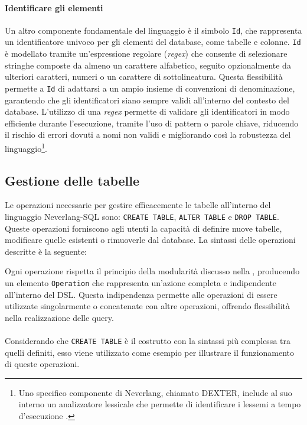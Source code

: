 \documentclass[12pt,a4paper,openright,twoside]{book}
\begin{document}
\paragraph{Identificare gli elementi}
Un altro componente fondamentale del linguaggio è il simbolo \texttt{Id}, che rappresenta un identificatore univoco per gli 
elementi del database, come tabelle e colonne. \texttt{Id} è modellato tramite un’espressione regolare (\textit{regex}) che consente 
di selezionare stringhe composte da almeno un carattere alfabetico, seguito opzionalmente da ulteriori caratteri, numeri o un 
carattere di sottolineatura. Questa flessibilità permette a \texttt{Id} di adattarsi a un ampio insieme di convenzioni di 
denominazione, garantendo che gli identificatori siano sempre validi all’interno del contesto del database. L’utilizzo di una 
\textit{regex} permette di validare gli identificatori in modo efficiente durante l’esecuzione, tramite l’uso di pattern o parole 
chiave, riducendo il rischio di errori dovuti a nomi non validi e migliorando così la robustezza del linguaggio\footnote{Uno 
specifico componente di Neverlang, chiamato DEXTER, include al suo interno un analizzatore lessicale che permette di identificare 
i lessemi a tempo d’esecuzione \cite{Dexter2012, Vacchi2015}.}.


\subsection{Gestione delle tabelle}
Le operazioni necessarie per gestire efficacemente le tabelle all’interno del linguaggio Neverlang-SQL sono: \texttt{CREATE TABLE}, \texttt{ALTER 
TABLE} e \texttt{DROP TABLE}. Queste operazioni forniscono agli utenti la capacità di definire nuove tabelle, modificare quelle esistenti o 
rimuoverle dal database. La sintassi delle operazioni descritte è la seguente:


Ogni operazione rispetta il principio della modularità discusso nella , producendo un elemento 
\texttt{Operation} che rappresenta un’azione completa e indipendente all’interno del DSL. Questa indipendenza permette alle 
operazioni di essere utilizzate singolarmente o concatenate con altre operazioni, offrendo flessibilità nella realizzazione delle 
query.\\\\
Considerando che \texttt{CREATE TABLE} è il costrutto con la sintassi più complessa tra quelli definiti, esso viene utilizzato come esempio 
per illustrare il funzionamento di queste operazioni.
\end{document}
